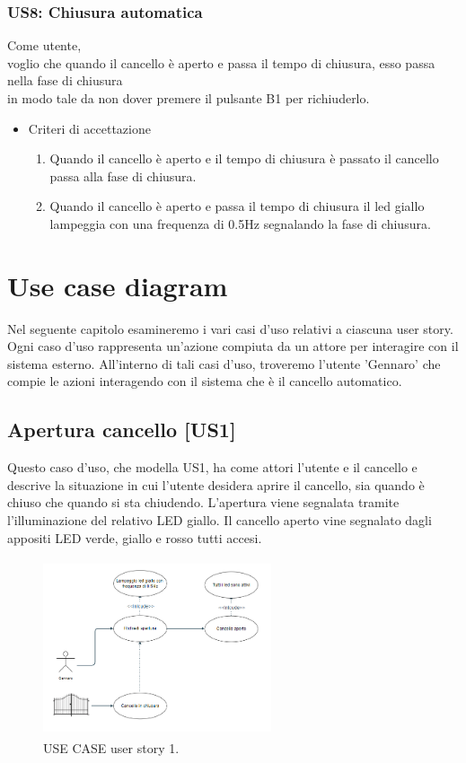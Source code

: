 \documentclass[12pt]{article}
\begin{document}
\subsubsection{US8: Chiusura automatica}
Come utente, \\
voglio che quando il cancello è aperto e passa il tempo di chiusura, esso passa nella fase di chiusura\\
in modo tale da non dover premere il pulsante B1 per richiuderlo.
\begin{itemize}
    \item Criteri di accettazione
    \begin{enumerate}
        \item Quando il cancello è aperto e il tempo di chiusura è passato il cancello passa alla fase di chiusura.
        \item Quando il cancello è aperto e passa il tempo di chiusura il led giallo lampeggia con una frequenza di 0.5Hz segnalando la fase di chiusura.
    \end{enumerate}
\end{itemize}

\newpage



\section{Use case diagram}
Nel seguente capitolo esamineremo i vari casi d'uso relativi a ciascuna user story. Ogni caso d'uso rappresenta un'azione compiuta da un attore per interagire con il sistema esterno. All'interno di tali casi d'uso, troveremo l'utente 'Gennaro' che compie le azioni interagendo con il sistema che è il cancello automatico.

\subsection{Apertura cancello [US1]}
Questo caso d'uso, che modella US1, ha come attori l'utente e il cancello e descrive la situazione in cui l'utente desidera aprire il cancello, sia quando è chiuso che quando si sta chiudendo. L'apertura viene segnalata tramite l'illuminazione del relativo LED giallo. Il cancello aperto vine segnalato dagli appositi LED verde, giallo e rosso tutti accesi.
    \begin{figure}[H]
        \centering
        \includegraphics[width=0.6\textwidth,height=5.2cm]{use_case_us1.PNG}
        \caption{USE CASE user story 1.}
        \label{fig:use_case_us1}
    \end{figure}
    
\end{document}
